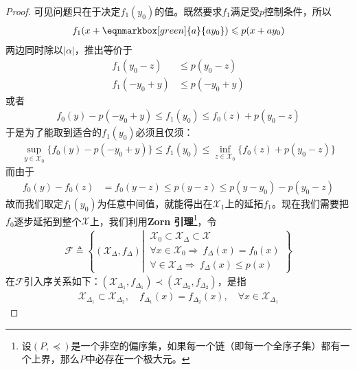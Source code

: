 \begin{enumerate}[leftmargin=2cm, label=\arabic*]
\begin{proof}
			可见问题只在于决定$f_1(y_0)$的值。既然要求$f_1$满足受$p$控制条件，所以
			\vspace{0.5em}
			\begin{align*}
				f_1(x+\eqnmarkbox[green]{a}{ay_0}) \leqslant p(x+ay_0)
			\end{align*}
			两边同时除以$|\alpha|$，推出等价于
			\begin{align*}
				f_1(y_0-z) &\leqslant p(y_0-z)\\
				f_1(-y_0+y) &\leqslant p(-y_0 + y) 
			\end{align*}
			或者
			\begin{align*}
				f_0(y) - p(-y_0 + y) \leqslant f_1(y_0) \leqslant f_0(z) + p(y_0-z)
			\end{align*}
			于是为了能取到适合的$f_1(y_0)$必须且仅须：
			\begin{align*}
				\sup\limits_{y\in\mathscr{X}_0} \{f_0(y) - p(-y_0+y)\} \leqslant f_1(y_0) \leqslant \inf\limits_{z\in\mathscr{X}_0} \{f_0(z) + p(y_0-z)\}
			\end{align*}
			而由于
			\begin{align*}
				f_0(y) - f_0(z) &= f_0(y-z) \leqslant p(y-z) \leqslant p(y-y_0) - p(y_0 - z)
			\end{align*}
			故而我们取定$f_1(y_0)$为任意中间值，就能得出在$\mathscr{X}_1$上的延拓$f_1$。现在我们需要把$f_0$逐步延拓到整个$\mathscr{X}$上，我们利用\textbf{Zorn 引理}\footnote{设$(P,\preceq)$是一个非空的偏序集，如果每一个链（即每一个全序子集）都有一个上界，那么$P$中必存在一个极大元。}，令
			\begin{align*}
				\mathscr{F} \triangleq \left\lbrace (\mathscr{X}_{\Delta}, f_{\Delta}) \left|\ \begin{array}{l}
					\mathscr{X}_0\subset \mathscr{X}_{\Delta}\subset \mathscr{X}  \\
					\forall x\in\mathscr{X}_0\Longrightarrow\ f_{\Delta}(x) = f_0(x) \\
					\forall \in\mathscr{X}_{\Delta} \Longrightarrow\ f_{\Delta}(x) \leqslant p(x)
				\end{array}\right. \right\rbrace
			\end{align*}
			在$\mathscr{F}$引入序关系如下：$(\mathscr{X}_{\Delta_1},f_{\Delta_1})\prec (\mathscr{X}_{\Delta_2},f_{\Delta_2})$，是指
			\begin{align*}
				\mathscr{X}_{\Delta_1}\subset \mathscr{X}_{\Delta_2},\quad f_{\Delta_1}(x) = f_{\Delta_2}(x), \quad \forall x\in\mathscr{X}_{\Delta_1}
			\end{align*}

\end{proof}
\end{enumerate}
